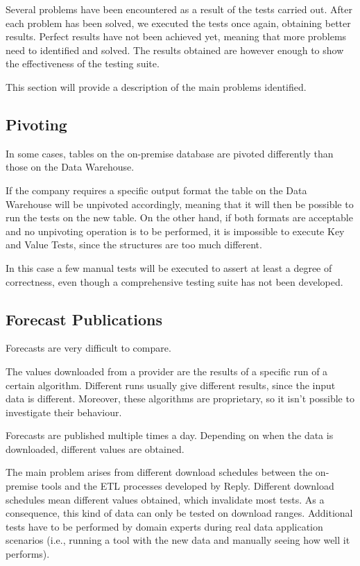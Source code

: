 Several problems have been encountered as a result of the tests carried out.
After each problem has been solved, we executed the tests once again, obtaining better results.
Perfect results have not been achieved yet, meaning that more problems need to identified and solved.
The results obtained are however enough to show the effectiveness of the testing suite.

This section will provide a description of the main problems identified.

\subsection{Pivoting}
    In some cases, tables on the on-premise database are pivoted differently than those on the Data Warehouse.
    
    If the company requires a specific output format the table on the Data Warehouse will be unpivoted accordingly, meaning that it will then be possible to run the tests on the new table.
    On the other hand, if both formats are acceptable and no unpivoting operation is to be performed, it is impossible to execute Key and Value Tests, since the structures are too much different.
    
    In this case a few manual tests will be executed to assert at least a degree of correctness, even though a comprehensive testing suite has not been developed.

\subsection{Forecast Publications} \label{section:tests:data:fct_publ}
    Forecasts are very difficult to compare.
    
    The values downloaded from a provider are the results of a specific run of a certain algorithm.
    Different runs usually give different results, since the input data is different.
    Moreover, these algorithms are proprietary, so it isn't possible to investigate their behaviour.
    
    Forecasts are published multiple times a day.
    Depending on when the data is downloaded, different values are obtained.
    
    The main problem arises from different download schedules between the on-premise tools and the ETL processes developed by Reply.
    Different download schedules mean different values obtained, which invalidate most tests.
    As a consequence, this kind of data can only be tested on download ranges.
    Additional tests have to be performed by domain experts during real data application scenarios (i.e., running a tool with the new data and manually seeing how well it performs).
    
